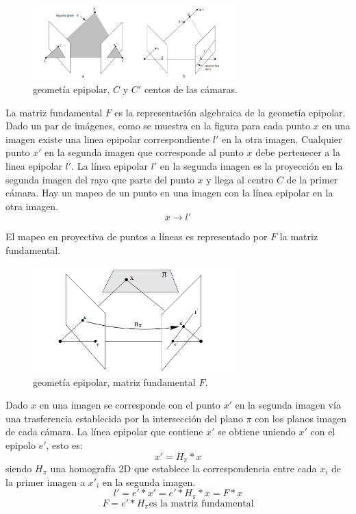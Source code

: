 \begin{figure}[H]
  \centering
    \includegraphics[width=0.7\textwidth]{./Cap6_reconstruccion/epipolar.PNG}
  \caption{geometía epipolar, $C$ y $C'$ centos de las cámaras.}%
  \label{fig:Epipolar}
\end{figure}
La matriz fundamental $F$ es la representación algebraica de la geometía epipolar.
Dado un par de imágenes, como se muestra en la figura para cada punto $x$ en una imagen existe una linea epipolar correspondiente $l'$ en la otra imagen. Cualquier punto $x'$ en la segunda imagen que corresponde al punto $x$ debe pertenecer a la linea epipolar $l'$.
La línea epipolar $l'$ en la segunda imagen es la proyección en la segunda imagen del rayo que parte del punto $x$ y llega al centro $C$ de la primer cámara. Hay un mapeo de un punto en una imagen con la línea epipolar en la otra imagen.
\[  x \to l'
\]
 
El mapeo en proyectiva de puntos a líneas es representado por $F$ la matriz fundamental.

\begin{figure}[H]
  \centering
    \includegraphics[width=0.7\textwidth]{./Cap6_reconstruccion/epipolar2.PNG}
  \caption{geometía epipolar, matriz fundamental $F$.} %
  \label{fig:Epipolar2}
\end{figure}
Dado $x$ en una imagen se corresponde con el punto $x'$ en la segunda imagen vía una trasferencia establecida por la intersección del plano $\pi$ con los planos imagen de cada cámara.
La línea epipolar que contiene $x'$ se obtiene uniendo $x'$ con el epipolo $e'$, esto es:
\[ x' = H_{\pi} * x \]    siendo  $H_{\pi}$ una homografía 2D que establece la correspondencia entre cada $x_i$ de la primer imagen a $x'_i$ en la segunda imagen.
\[ l' = e' * x' = e' * H_{\pi} * x = F * x  \]
\[ F = e' * H_{\pi}  \mbox{es la matriz fundamental}  \]

